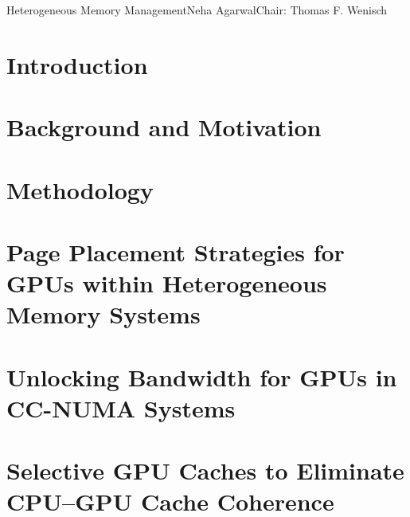 \documentclass[reqno,12pt,oneside]{umdiss2-proposal} %
\theoremstyle{plain}
\theoremstyle{definition}
\theoremstyle{remark}
\numberwithin{theorem}{chapter}     %
\begin{document}
\tableofcontents     %
\listoffigures       %
\listofabbreviations %

\startabstractpage
{Heterogeneous Memory Management}{Neha Agarwal}{Chair: Thomas F. Wenisch}

\label{abstract}

\startthechapters 

 \chapter{Introduction}
 \label{chap:intro}
 

 \chapter{Background and Motivation}
 \label{chap:background}
 

 \chapter{Methodology}
 \label{chap:methodology}
 

 \chapter{Page Placement Strategies for GPUs within Heterogeneous
Memory Systems}
 \label{chap:asplos2015}
 

 \chapter{Unlocking Bandwidth for GPUs in CC-NUMA Systems}
 \label{chap:hpca2015}
 

 \chapter{Selective GPU Caches to Eliminate CPU--GPU Cache Coherence}
 \label{chap:hpca2016}
 
\end{document}
